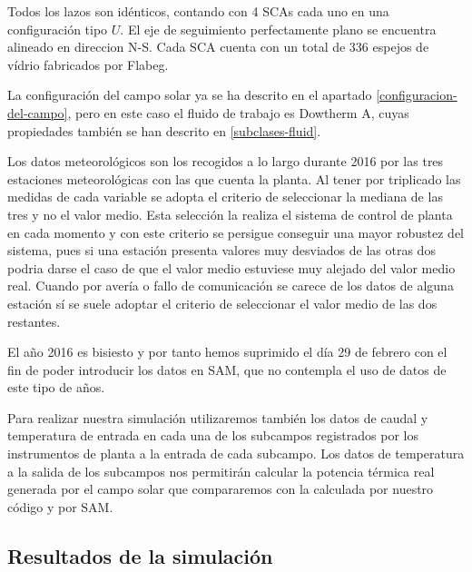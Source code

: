 Todos los lazos son idénticos, contando con 4 SCAs cada uno en una configuración tipo \(U\). El eje de seguimiento perfectamente plano se encuentra alineado en direccion N-S. Cada SCA cuenta con un total de 336 espejos de vídrio fabricados por Flabeg.


La configuración del campo solar ya se ha descrito en el apartado \ref{configuracion-del-campo}, pero en este caso el fluido de trabajo es Dowtherm A, cuyas propiedades también se han descrito en \ref{subclases-fluid}.

Los datos meteorológicos son los recogidos a lo largo durante 2016 por las tres estaciones meteorológicas con las que cuenta la planta. Al tener por triplicado las medidas de cada variable se adopta el criterio de seleccionar la mediana de las tres y no el valor medio. Esta selección la realiza el sistema de control de planta en cada momento y con este criterio se persigue conseguir una mayor robustez del sistema, pues si una estación presenta valores muy desviados de las otras dos podria darse el caso de que el valor medio estuviese muy alejado del valor medio real. Cuando por avería o fallo de comunicación se carece de los datos de alguna estación sí se suele adoptar el criterio de seleccionar el valor medio de las dos restantes.

El año 2016 es bisiesto y por tanto hemos suprimido el día 29 de febrero con el fin de poder introducir los datos en SAM, que no contempla el uso de datos de este tipo de años.

Para realizar nuestra simulación utilizaremos también los datos de caudal y temperatura de entrada en cada una de los subcampos registrados por los instrumentos de planta a la entrada de cada subcampo. Los datos de temperatura a la salida de los subcampos nos permitirán calcular la potencia térmica real generada por el campo solar que compararemos con la calculada por nuestro código y por SAM. 

\subsection{Resultados de la simulación}



 

